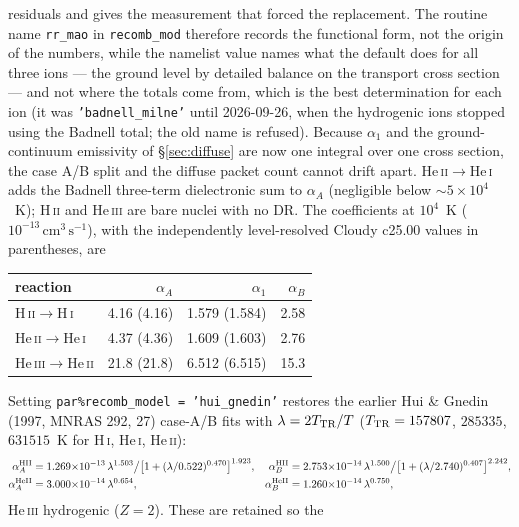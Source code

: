 \documentclass[english,a4paper]{my_memo}
\newcommand{\code}[1]{\texttt{#1}}
\newcommand{\cmc}{\mathrm{cm^{3}\,s^{-1}}}
\begin{document}
residuals and gives the measurement that forced the replacement.  The
routine name \code{rr\_mao} in \code{recomb\_mod} therefore records the
functional form, not the origin of the numbers, while the namelist value
names what the default does for all three ions --- the ground level by
detailed balance on the transport cross section --- and not where the
totals come from, which is the best determination for each ion (it was
\code{'badnell\_milne'} until 2026-09-26, when the hydrogenic ions stopped
using the Badnell total; the old name is refused).  Because $\alpha_1$ and the
ground-continuum emissivity of \S\ref{sec:diffuse} are now one integral
over one cross section, the case A/B split and the diffuse packet count
cannot drift apart.  He\,\textsc{ii}$\to$He\,\textsc{i} adds
the Badnell three-term dielectronic sum to $\alpha_A$ (negligible below
$\sim5{\times}10^4$~K); H\,\textsc{ii} and He\,\textsc{iii} are bare
nuclei with no DR.  The coefficients at $10^4$~K
($10^{-13}\,\cmc$), with the independently level-resolved Cloudy c25.00
values in parentheses, are
\begin{center}\small
\begin{tabular}{lrrr}
\toprule
reaction & $\alpha_A$ & $\alpha_1$ & $\alpha_B$ \\
\midrule
H\,\textsc{ii}$\to$H\,\textsc{i}     & 4.16 (4.16) & 1.579 (1.584) & 2.58 \\
He\,\textsc{ii}$\to$He\,\textsc{i}   & 4.37 (4.36) & 1.609 (1.603) & 2.76 \\
He\,\textsc{iii}$\to$He\,\textsc{ii} & 21.8 (21.8) & 6.512 (6.515) & 15.3 \\
\bottomrule
\end{tabular}
\end{center}
Setting \code{par\%recomb\_model = 'hui\_gnedin'} restores the earlier
Hui \& Gnedin (1997, MNRAS 292, 27) case-A/B fits with
$\lambda = 2T_{\rm TR}/T$ ($T_{\rm TR} = 157807$, $285335$, $631515$~K
for H\,\textsc{i}, He\,\textsc{i}, He\,\textsc{ii}):
\begin{align}
  \alpha_A^{\rm HII} &= 1.269{\times}10^{-13}\,
    \lambda^{1.503}\big/\big[1+(\lambda/0.522)^{0.470}\big]^{1.923}, &
  \alpha_B^{\rm HII} &= 2.753{\times}10^{-14}\,
    \lambda^{1.500}\big/\big[1+(\lambda/2.740)^{0.407}\big]^{2.242},
    \nonumber\\
  \alpha_A^{\rm HeII} &= 3.000{\times}10^{-14}\,\lambda^{0.654}, &
  \alpha_B^{\rm HeII} &= 1.260{\times}10^{-14}\,\lambda^{0.750},
\end{align}
He\,\textsc{iii} hydrogenic ($Z{=}2$).  These are retained so the
\end{document}
